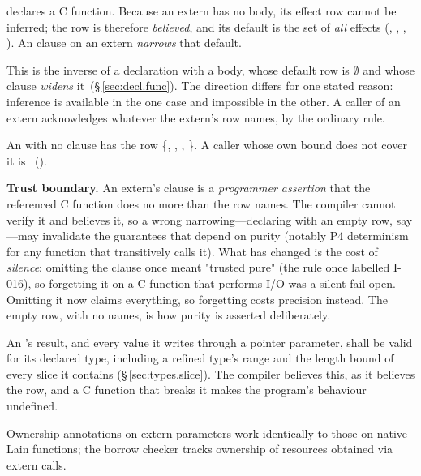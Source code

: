 \pnum
{} declares a C function.  Because an
extern has no body, its effect row cannot be inferred; the row is therefore
\emph{believed}, and its default is the set of \emph{all} effects
(, , , ).  An
 clause on an extern \emph{narrows} that default.

\pnum
This is the inverse of a declaration with a body, whose default row is
$\emptyset$ and whose clause \emph{widens} it~(\S\,\ref{sec:decl.func}).
The direction differs for one stated reason: inference is available in the
one case and impossible in the other.  A caller of an extern acknowledges
whatever the extern's row names, by the ordinary rule.

\begin{constraint}
  An  with no  clause has the row
  \{, , , \}.  A caller
  whose own bound does not cover it is \illformed{}~().
\end{constraint}

\begin{note}
  \textbf{Trust boundary.}
  An extern's  clause is a \textit{programmer assertion} that
  the referenced C function does no more than the row names.  The compiler
  cannot verify it and believes it, so a wrong narrowing---declaring
   with an empty row, say---may invalidate the guarantees
  that depend on purity (notably P4 determinism for any function that
  transitively calls it).  What has changed is the cost of \emph{silence}:
  omitting the clause once meant "trusted pure" (the rule once labelled I-016), so
  forgetting it on a C function that performs I/O was a silent fail-open.
  Omitting it now claims everything, so forgetting costs precision instead.
  The empty row,  with no names, is how purity is asserted
  deliberately.
\end{note}

\pnum
An 's result, and every value it writes through a pointer parameter, shall be valid
for its declared type, including a refined type's range and the length bound of every slice it
contains (\S\,\ref{sec:types.slice}).  The compiler believes this, as it believes the row, and a C
function that breaks it makes the program's behaviour undefined.

\pnum
Ownership annotations on extern parameters work identically to those on
native Lain functions; the borrow checker tracks ownership of resources
obtained via extern calls.

